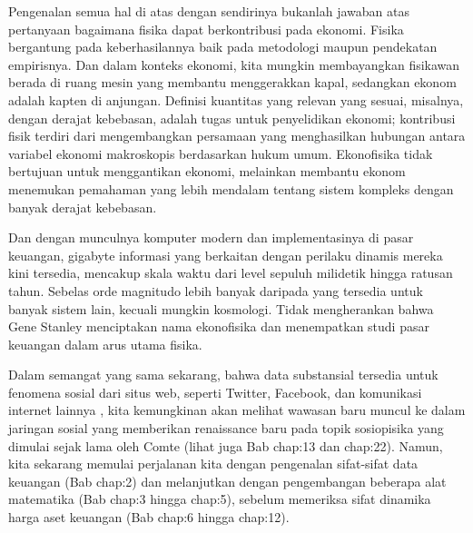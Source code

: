 \documentclass[a4paper,12pt]{book}
\begin{document}
Pengenalan semua hal di atas dengan sendirinya bukanlah jawaban atas pertanyaan bagaimana fisika dapat berkontribusi pada ekonomi. Fisika bergantung pada keberhasilannya baik pada metodologi maupun pendekatan empirisnya. Dan dalam konteks ekonomi, kita mungkin membayangkan fisikawan berada di ruang mesin yang membantu menggerakkan kapal, sedangkan ekonom adalah kapten di anjungan. Definisi kuantitas yang relevan yang sesuai, misalnya, dengan derajat kebebasan, adalah tugas untuk penyelidikan ekonomi; kontribusi fisik terdiri dari mengembangkan persamaan yang menghasilkan hubungan antara variabel ekonomi makroskopis berdasarkan hukum umum. Ekonofisika tidak bertujuan untuk menggantikan ekonomi, melainkan membantu ekonom menemukan pemahaman yang lebih mendalam tentang sistem kompleks dengan banyak derajat kebebasan.

Dan dengan munculnya komputer modern dan implementasinya di pasar keuangan, gigabyte informasi yang berkaitan dengan perilaku dinamis mereka kini tersedia, mencakup skala waktu dari level sepuluh milidetik \cite{preis2010} hingga ratusan tahun. Sebelas orde magnitudo lebih banyak daripada yang tersedia untuk banyak sistem lain, kecuali mungkin kosmologi. Tidak mengherankan bahwa Gene Stanley menciptakan nama ekonofisika dan menempatkan studi pasar keuangan dalam arus utama fisika.

Dalam semangat yang sama sekarang, bahwa data substansial tersedia untuk fenomena sosial dari situs web, seperti Twitter, Facebook, dan komunikasi internet lainnya \cite{caldarelli2007, hardiman2009}, kita kemungkinan akan melihat wawasan baru muncul ke dalam jaringan sosial yang memberikan renaissance baru pada topik sosiopisika yang dimulai sejak lama oleh Comte (lihat juga Bab  {chap:13} dan  {chap:22}). Namun, kita sekarang memulai perjalanan kita dengan pengenalan sifat-sifat data keuangan (Bab  {chap:2}) dan melanjutkan dengan pengembangan beberapa alat matematika (Bab  {chap:3} hingga  {chap:5}), sebelum memeriksa sifat dinamika harga aset keuangan (Bab  {chap:6} hingga  {chap:12}).
\end{document}

